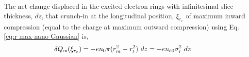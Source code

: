 \documentclass[aps,twocolumn,notitlepage,superscriptaddress]{revtex4-1}
\makeatletter
\newcommand{\ClosedSqrt}[1][\hphantom{3}]{\def\DHLindex{#1}\mathpalette\DHLhksqrt}
\newcommand*\bold@name{bold}
\def\DHLhksqrt#1#2{%
        \setbox0=\hbox{$#1\OldSqrt{#2\,}$}\dimen0=\ht0\relax%
        \advance\dimen0-0.2\ht0\relax%
        \setbox2=\hbox{\vrule height\ht0 depth -\dimen0}%
        {\hbox{$#1\expandafter\OldSqrt\expandafter[\DHLindex]{#2\,}$}
        \lower\ifx\math@version\bold@name0.6pt\else0.4pt\fi\box2}
    }
\renewcommand*{\sqrt}[2][\ ]{\ClosedSqrt[\leftroot{-2}\uproot{1}#1]{#2}\kern0.1em}
\makeatother
\begin{document}
%
%
%

The net change displaced in the excited electron rings with infinitesimal slice thickness, $dz$, that crunch-in at the longitudinal position, $\xi_{r_c}$ of maximum inward compression (equal to the charge at maximum outward compression) using Eq.\ref{eq:r-max-nano-Gaussian} is,
\begin{align}\label{eq:charge-collective-rings-step-nano-Gaussian}
\begin{split}
\delta Q_{\rm m}&(\xi_{r_c})  = - e n_0 \pi (r_m^2 - r_t^2) ~ dz = - e n_{b0} \sigma_r^2 ~ dz
\end{split}
\end{align}
\end{document}
